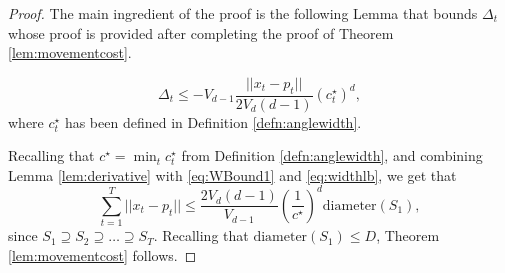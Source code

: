 \begin{proof}
The main ingredient of the proof is the following Lemma that bounds  $\Delta_t$ whose proof is provided after completing the proof of Theorem \ref{lem:movementcost}.
\begin{lemma}\label{lem:derivative} $$\Delta_t  \le -V_{d-1}\frac{||x_t-p_t||}{2V_d(d-1)}  (c_t^\star)^{d},$$
where $c_t^\star$ has been defined in Definition \ref{defn:anglewidth}.
\end{lemma}


Recalling that $c^\star = \min_t  c^\star_t$ from Definition \ref{defn:anglewidth}, and  combining  Lemma \ref{lem:derivative} with \eqref{eq:WBound1} and \eqref{eq:widthlb}, we get that 
$$\sum_{t=1}^T ||x_t-p_t|| \le \frac{2V_d(d-1)}{V_{d-1}} \left(\frac{1}{c^\star}\right)^{d}\text{diameter}(S_1),$$
since $S_1\supseteq S_2 \supseteq \dots \supseteq S_T$. Recalling that $\text{diameter}(S_1)\le D$, Theorem \ref{lem:movementcost} follows.
\end{proof}

